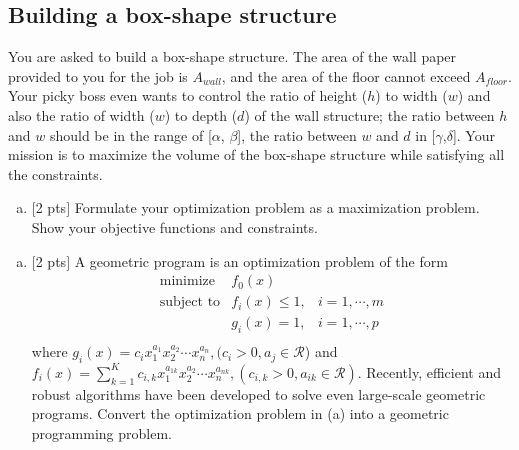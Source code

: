\documentclass[12pt]{article}
\begin{document}
\vspace{.25cm}

\subsection{Building a box-shape structure}
You are asked to build a box-shape structure. The area of the wall paper provided to you for the job is $A_{wall}$, and the area of the floor cannot exceed $A_{floor}$. Your picky boss even wants to control the ratio of height ($h$) to width ($w$) and also the ratio of width ($w$) to depth ($d$) of the wall structure; the ratio between $h$ and $w$ should be in the range of [$\alpha$, $\beta$], the ratio between $w$ and $d$ in [$\gamma$,$\delta$]. Your mission is to maximize the volume of the box-shape structure while satisfying all the constraints. 
\begin{enumerate}[(a)]
\item $[$2 pts$]$ Formulate your optimization problem as a maximization problem. Show your objective functions and constraints.
\end{enumerate}
\vspace{.25cm}

\begin{enumerate}[(b)]
\item $[$2 pts$]$ A geometric program is an optimization problem of the form
\begin{eqnarray*}
\text{minimize} & f_{0}(x) &\\
\text{subject to} & f_{i}(x) \leq 1, & i=1,\cdots,m\\
 & g_{i}(x) = 1, & i=1,\cdots,p\\
\end{eqnarray*}
where $g_{i}(x) = c_{i}x_{1}^{a_{1}}x_{2}^{a_{2}}\cdots x_{n}^{a_{n}}, (c_{i}>0, a_{j}\in \mathcal{R}$) and $f_{i}(x) = \sum_{k=1}^{K}c_{i,k}x_{1}^{a_{1k}}x_{2}^{a_{2}}\cdots x_{n}^{a_{nk}}, (c_{i,k}>0, a_{ik}\in \mathcal{R})$. Recently, efficient and robust algorithms have been developed to solve even large-scale geometric programs. Convert the optimization problem in (a) into a geometric programming problem.
\end{enumerate}
\vspace{.25cm}

\end{document}
